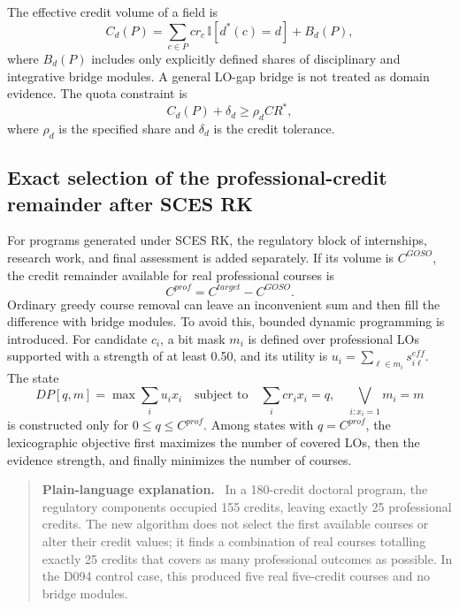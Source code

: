\documentclass[twoside,11pt]{article}
\newenvironment{plainbox}{\begin{quote}\small\noindent\textbf{Plain-language explanation.}\ }{\end{quote}}
\begin{document}
The effective credit volume of a field is
\begin{equation}
C_d(P)=\sum_{c\in P}cr_c\,\mathbb{I}[d^{\ast}(c)=d]+B_d(P),
\label{eq:effective-domain-credits}
\end{equation}
where $B_d(P)$ includes only explicitly defined shares of disciplinary and integrative bridge modules. A general LO-gap bridge is not treated as domain evidence. The quota constraint is
\begin{equation}
C_d(P)+\delta_d\geq \rho_d CR^{\ast},
\label{eq:domain-quota-tolerance}
\end{equation}
where $\rho_d$ is the specified share and $\delta_d$ is the credit tolerance.

\subsection{Exact selection of the professional-credit remainder after SCES RK}

For programs generated under SCES RK, the regulatory block of internships, research work, and final assessment is added separately. If its volume is $C^{GOSO}$, the credit remainder available for real professional courses is
\begin{equation}
  C^{prof}=C^{target}-C^{GOSO}.
  \label{eq:professional-residual}
\end{equation}
Ordinary greedy course removal can leave an inconvenient sum and then fill the difference with bridge modules. To avoid this, bounded dynamic programming is introduced. For candidate $c_i$, a bit mask $m_i$ is defined over professional LOs supported with a strength of at least 0.50, and its utility is $u_i=\sum_{\ell\in m_i}s_{i\ell}^{eff}$. The state
\begin{equation}
  DP[q,m]=\max \sum_i u_i x_i
  \quad\text{subject to}\quad
  \sum_i cr_i x_i=q,
  \quad \bigvee_{i:x_i=1}m_i=m
  \label{eq:goso-knapsack}
\end{equation}
is constructed only for $0\le q\le C^{prof}$. Among states with $q=C^{prof}$, the lexicographic objective first maximizes the number of covered LOs, then the evidence strength, and finally minimizes the number of courses.

\begin{plainbox}
In a 180-credit doctoral program, the regulatory components occupied 155 credits, leaving exactly 25 professional credits. The new algorithm does not select the first available courses or alter their credit values; it finds a combination of real courses totalling exactly 25 credits that covers as many professional outcomes as possible. In the D094 control case, this produced five real five-credit courses and no bridge modules.
\end{plainbox}
\end{document}
